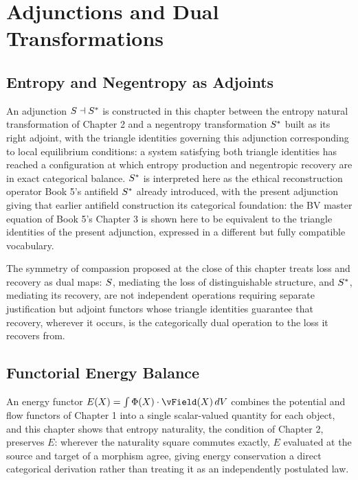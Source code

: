 \part{Adjunctions and Dual Transformations}

\chapter{Entropy and Negentropy as Adjoints}

An adjunction $S \dashv S^{*}$ is constructed in this chapter between the entropy natural transformation of Chapter 2 and a negentropy transformation $S^{*}$ built as its right adjoint, with the triangle identities governing this adjunction corresponding to local equilibrium conditions: a system satisfying both triangle identities has reached a configuration at which entropy production and negentropic recovery are in exact categorical balance. $S^{*}$ is interpreted here as the ethical reconstruction operator Book 5's antifield $S^{*}$ already introduced, with the present adjunction giving that earlier antifield construction its categorical foundation: the BV master equation of Book 5's Chapter 3 is shown here to be equivalent to the triangle identities of the present adjunction, expressed in a different but fully compatible vocabulary.

The symmetry of compassion proposed at the close of this chapter treats loss and recovery as dual maps: $S$, mediating the loss of distinguishable structure, and $S^{*}$, mediating its recovery, are not independent operations requiring separate justification but adjoint functors whose triangle identities guarantee that recovery, wherever it occurs, is the categorically dual operation to the loss it recovers from.

\chapter{Functorial Energy Balance}

An energy functor $E(X) = \int \PhiField(X) \cdot \vField(X)\, dV$ combines the potential and flow functors of Chapter 1 into a single scalar-valued quantity for each object, and this chapter shows that entropy naturality, the condition of Chapter 2, preserves $E$: wherever the naturality square commutes exactly, $E$ evaluated at the source and target of a morphism agree, giving energy conservation a direct categorical derivation rather than treating it as an independently postulated law.

